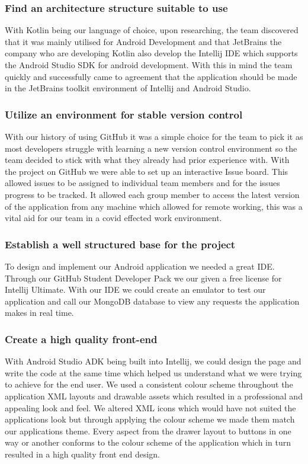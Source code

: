 \subsubsection {Find an architecture structure suitable to use}
With Kotlin being our language of choice, upon researching, the team discovered that it was mainly utilised for Android Development and that JetBrains the company who are developing Kotlin also develop the Intellij IDE which supports the Android Studio SDK for android development. With this in mind the team quickly and successfully came to agreement that the application should be made in the JetBrains toolkit environment of Intellij and Android Studio.
\subsubsection {Utilize an environment for stable version control}
With our history of using GitHub it was a simple choice for the team to pick it as most developers struggle with learning a new version control environment so the team decided to stick with what they already had prior experience with. With the project on GitHub we were able to set up an interactive Issue board. This allowed issues to be assigned to individual team members and for the issues progress to be tracked. It allowed each group member to access the latest version of the application from any machine which allowed for remote working, this was a vital aid for our team in a covid effected work environment.
\subsubsection {Establish a well structured base for the project}
To design and implement our Android application we needed a great IDE. Through our GitHub Student Developer Pack we our given a free license for Intellij Ultimate. With our IDE we could create an emulator to test our application and call our MongoDB database to view any requests the application makes in real time.
\subsubsection {Create a high quality front-end}
With Android Studio ADK being built into Intellij, we could design the page and write the code at the same time which helped us understand what we were trying to achieve for the end user. We used a consistent colour scheme throughout the application XML layouts and drawable assets which resulted in a professional and appealing look and feel. We altered XML icons which would have not suited the applications look but through applying the colour scheme we made them match our applications theme. Every aspect from the drawer layout to buttons in one way or another conforms to the colour scheme of the application which in turn resulted in a high quality front end design.
